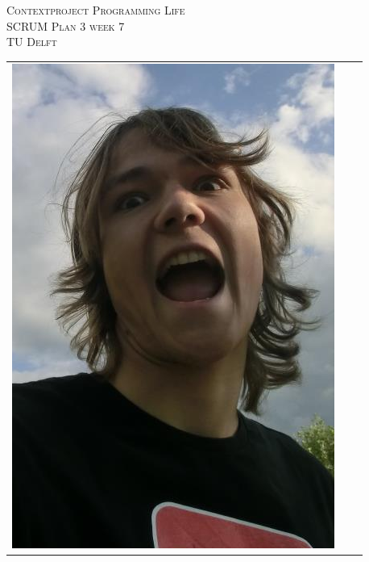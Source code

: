 \begin{titlepage}
\begin{center}
\textsc{\LARGE Contextproject Programming Life}\\
\vspace{5pt}
\textsc{\LARGE SCRUM Plan 3 week 7}\\
\vspace{5pt}
\textsc{\large TU Delft}

\begin{table}[ht]
\centering
\begin{tabular}{ccc}
\includegraphics[scale=0.2]{ruben.png}   &

\end{tabular}
\end{table}
\end{center}
\end{titlepage}
